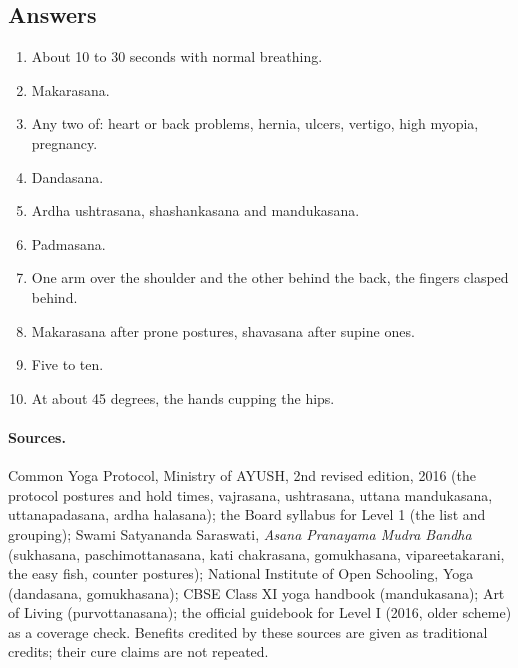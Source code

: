 \subsection*{Answers}
\begin{enumerate}
\item About 10 to 30 seconds with normal breathing.
\item Makarasana.
\item Any two of: heart or back problems, hernia, ulcers, vertigo, high myopia, pregnancy.
\item Dandasana.
\item Ardha ushtrasana, shashankasana and mandukasana.
\item Padmasana.
\item One arm over the shoulder and the other behind the back, the fingers clasped behind.
\item Makarasana after prone postures, shavasana after supine ones.
\item Five to ten.
\item At about 45 degrees, the hands cupping the hips.
\end{enumerate}

\paragraph{Sources.} Common Yoga Protocol, Ministry of AYUSH, 2nd revised edition, 2016 (the protocol postures and hold times, vajrasana, ushtrasana, uttana mandukasana, uttanapadasana, ardha halasana); the Board syllabus for Level 1 (the list and grouping); Swami Satyananda Saraswati, \emph{Asana Pranayama Mudra Bandha} (sukhasana, paschimottanasana, kati chakrasana, gomukhasana, vipareetakarani, the easy fish, counter postures); National Institute of Open Schooling, Yoga (dandasana, gomukhasana); CBSE Class XI yoga handbook (mandukasana); Art of Living (purvottanasana); the official guidebook for Level I (2016, older scheme) as a coverage check. Benefits credited by these sources are given as traditional credits; their cure claims are not repeated.
